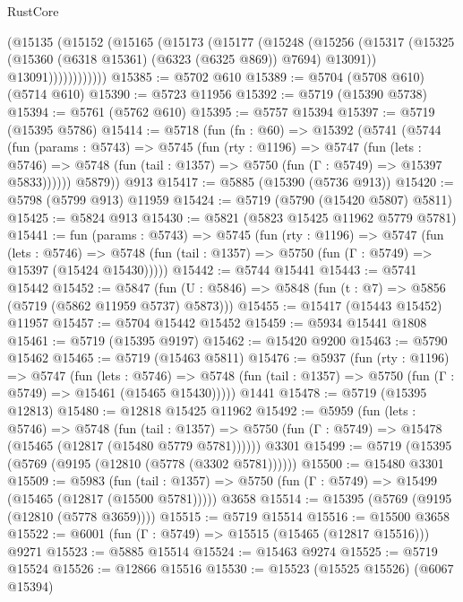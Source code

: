 \begin{lexlean}{RustCore}
\begin{coremodule}
              (@15135
                (@15152
                  (@15165
                    (@15173
                      (@15177
                        (@15248
                          (@15256
                            (@15317
                              (@15325 (@15360 (@6318 @15361) (@6323 (@6325 @869)) @7694) @13091))
                            @13091))))))))))))
@15385 := @5702 @610
@15389 := @5704 (@5708 @610) (@5714 @610)
@15390 := @5723 @11956
@15392 := @5719 (@15390 @5738)
@15394 := @5761 (@5762 @610)
@15395 := @5757 @15394
@15397 := @5719 (@15395 @5786)
@15414 := @5718
    (fun (fn : @60) =>
    @15392
      (@5741
        (@5744
          (fun (params : @5743) =>
          @5745
            (fun (rty : @1196) =>
            @5747
              (fun (lets : @5746) =>
              @5748 (fun (tail : @1357) => @5750 (fun (Γ : @5749) => @15397 @5833))))))
        @5879))
    @913
@15417 := @5885 (@15390 (@5736 @913))
@15420 := @5798 (@5799 @913) @11959
@15424 := @5719 (@5790 (@15420 @5807) @5811)
@15425 := @5824 @913
@15430 := @5821 (@5823 @15425 @11962 @5779 @5781)
@15441 := fun (params : @5743) =>
  @5745
    (fun (rty : @1196) =>
    @5747
      (fun (lets : @5746) =>
      @5748 (fun (tail : @1357) => @5750 (fun (Γ : @5749) => @15397 (@15424 @15430)))))
@15442 := @5744 @15441
@15443 := @5741 @15442
@15452 := @5847
    (fun (U : @5846) => @5848 (fun (t : @7) => @5856 (@5719 (@5862 @11959 @5737) @5873)))
@15455 := @15417 (@15443 @15452) @11957
@15457 := @5704 @15442 @15452
@15459 := @5934 @15441 @1808
@15461 := @5719 (@15395 @9197)
@15462 := @15420 @9200
@15463 := @5790 @15462
@15465 := @5719 (@15463 @5811)
@15476 := @5937
    (fun (rty : @1196) =>
    @5747
      (fun (lets : @5746) =>
      @5748 (fun (tail : @1357) => @5750 (fun (Γ : @5749) => @15461 (@15465 @15430)))))
    @1441
@15478 := @5719 (@15395 @12813)
@15480 := @12818 @15425 @11962
@15492 := @5959
    (fun (lets : @5746) =>
    @5748
      (fun (tail : @1357) =>
      @5750 (fun (Γ : @5749) => @15478 (@15465 (@12817 (@15480 @5779 @5781))))))
    @3301
@15499 := @5719 (@15395 (@5769 (@9195 (@12810 (@5778 (@3302 @5781))))))
@15500 := @15480 @3301
@15509 := @5983
    (fun (tail : @1357) => @5750 (fun (Γ : @5749) => @15499 (@15465 (@12817 (@15500 @5781)))))
    @3658
@15514 := @15395 (@5769 (@9195 (@12810 (@5778 @3659))))
@15515 := @5719 @15514
@15516 := @15500 @3658
@15522 := @6001 (fun (Γ : @5749) => @15515 (@15465 (@12817 @15516))) @9271
@15523 := @5885 @15514
@15524 := @15463 @9274
@15525 := @5719 @15524
@15526 := @12866 @15516
@15530 := @15523 (@15525 @15526) (@6067 @15394)

\end{coremodule}
\end{lexlean}
